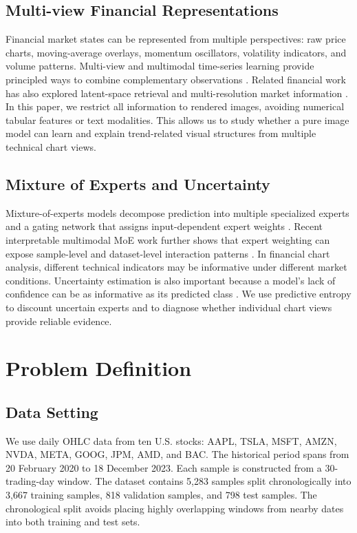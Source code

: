﻿\documentclass[conference]{IEEEtran}
\begin{document}
\subsection{Multi-view Financial Representations}
Financial market states can be represented from multiple perspectives: raw price charts, moving-average overlays, momentum oscillators, volatility indicators, and volume patterns. Multi-view and multimodal time-series learning provide principled ways to combine complementary observations \cite{jiang2025multimodal,wang2026multiview}. Related financial work has also explored latent-space retrieval and multi-resolution market information \cite{bamford2023retrieval,farimani2025contrastive}. In this paper, we restrict all information to rendered images, avoiding numerical tabular features or text modalities. This allows us to study whether a pure image model can learn and explain trend-related visual structures from multiple technical chart views.

\subsection{Mixture of Experts and Uncertainty}
Mixture-of-experts models decompose prediction into multiple specialized experts and a gating network that assigns input-dependent expert weights \cite{jacobs1991adaptive,shazeer2017outrageous}. Recent interpretable multimodal MoE work further shows that expert weighting can expose sample-level and dataset-level interaction patterns \cite{xin2024i2moe}. In financial chart analysis, different technical indicators may be informative under different market conditions. Uncertainty estimation is also important because a model's lack of confidence can be as informative as its predicted class \cite{guo2017calibration}. We use predictive entropy to discount uncertain experts and to diagnose whether individual chart views provide reliable evidence.



\section{Problem Definition}

\subsection{Data Setting}
We use daily OHLC data from ten U.S. stocks: AAPL, TSLA, MSFT, AMZN, NVDA, META, GOOG, JPM, AMD, and BAC. The historical period spans from 20 February 2020 to 18 December 2023. Each sample is constructed from a 30-trading-day window. The dataset contains 5,283 samples split chronologically into 3,667 training samples, 818 validation samples, and 798 test samples. The chronological split avoids placing highly overlapping windows from nearby dates into both training and test sets.
\end{document}
